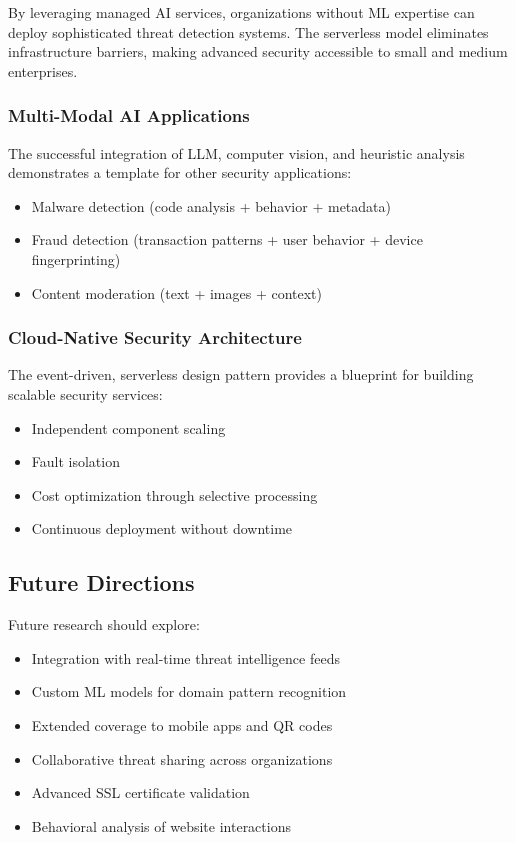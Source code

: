 \documentclass[conference]{IEEEtran}
\begin{document}
By leveraging managed AI services, organizations without ML expertise can deploy sophisticated threat detection systems. The serverless model eliminates infrastructure barriers, making advanced security accessible to small and medium enterprises.

\subsubsection{Multi-Modal AI Applications}

The successful integration of LLM, computer vision, and heuristic analysis demonstrates a template for other security applications:
\begin{itemize}
\item Malware detection (code analysis + behavior + metadata)
\item Fraud detection (transaction patterns + user behavior + device fingerprinting)
\item Content moderation (text + images + context)
\end{itemize}

\subsubsection{Cloud-Native Security Architecture}

The event-driven, serverless design pattern provides a blueprint for building scalable security services:
\begin{itemize}
\item Independent component scaling
\item Fault isolation
\item Cost optimization through selective processing
\item Continuous deployment without downtime
\end{itemize}

\subsection{Future Directions}

Future research should explore:
\begin{itemize}
\item Integration with real-time threat intelligence feeds
\item Custom ML models for domain pattern recognition
\item Extended coverage to mobile apps and QR codes
\item Collaborative threat sharing across organizations
\item Advanced SSL certificate validation
\item Behavioral analysis of website interactions
\end{itemize}
\end{document}
